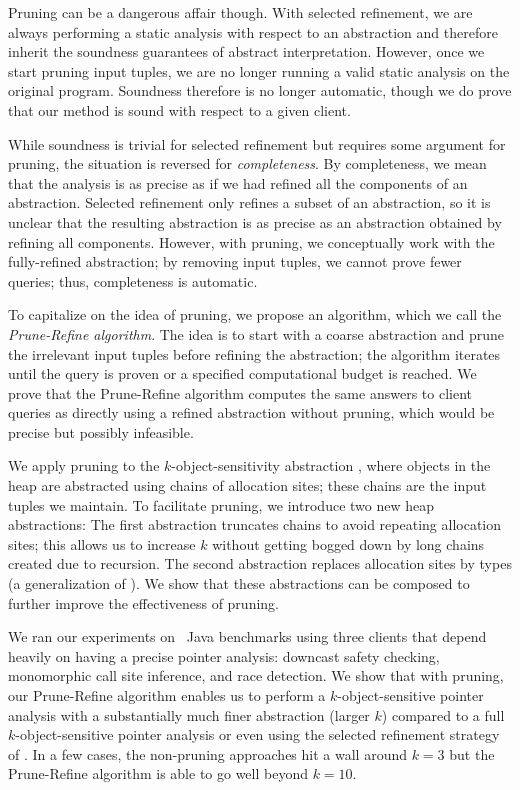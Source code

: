 Pruning can be a dangerous affair though.  With selected refinement,
we are always performing a static analysis with respect to an abstraction
and therefore inherit the soundness guarantees of abstract interpretation.
However, once we start pruning input tuples, we are no longer running a valid
static analysis on the original program.  Soundness therefore is no longer automatic,
though we do prove that our method is sound with respect to a given client.

While soundness is trivial for selected refinement but requires some
argument for pruning, the situation is reversed for {\em completeness}.  By
completeness, we mean that the analysis is as precise as
if we had refined all the components of an abstraction.  Selected
refinement only refines a subset of an abstraction, so it is unclear
that the resulting abstraction is as precise as an abstraction obtained by
refining all components.  However, with pruning, we conceptually work with the
fully-refined abstraction; by removing input tuples, we cannot prove fewer
queries; thus, completeness is automatic.

To capitalize on the idea of pruning, we propose an algorithm, which we
call the {\em Prune-Refine algorithm}.  The idea is to start with a coarse abstraction
and prune the irrelevant input tuples before refining the abstraction; the
algorithm iterates until the query is proven or a specified computational budget
is reached.  We prove that the Prune-Refine algorithm computes the same answers to client queries
as directly using a refined abstraction without pruning, which would be precise
but possibly infeasible.

We apply pruning to the $k$-object-sensitivity abstraction
\cite{kobj}, where objects in the heap are abstracted using chains of
allocation sites; these chains are the input tuples we maintain.
To facilitate pruning, we introduce two new heap abstractions:
The first abstraction truncates chains to avoid repeating
allocation sites; this allows us to increase $k$ without getting bogged down by long chains created due to recursion.
The second abstraction replaces allocation sites by types (a generalization of
\cite{smaragdakis11context}).
We show that these abstractions can be composed to further improve the effectiveness of pruning.

We ran our experiments on \numBenchmarks\ Java benchmarks using three clients that
depend heavily on having a precise pointer analysis: downcast safety
checking, monomorphic call site inference, and race detection.
We show that with pruning, our Prune-Refine algorithm enables us to perform a $k$-object-sensitive
pointer analysis with a substantially much finer abstraction (larger $k$)
compared to a full $k$-object-sensitive pointer analysis or even using the selected
refinement strategy of \cite{liang11minimal}.
In a few cases, the non-pruning approaches hit a wall around $k=3$ but the Prune-Refine
algorithm is able to go well beyond $k=10$.
